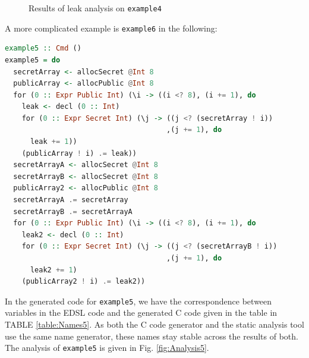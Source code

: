\documentclass[10pt, conference]{IEEEtran}
\newcommand{\ttt}{\texttt}
\begin{document}
\begin{figure}[h]
\centering
\caption{Results of leak analysis on \ttt{example4}}
\label{fig:Analysis4}
\end{figure}

A more complicated example is \ttt{example6} in the following:

\begin{lstlisting}[language=Haskell]
example5 :: Cmd ()
example5 = do
  secretArray <- allocSecret @Int 8
  publicArray <- allocPublic @Int 8
  for (0 :: Expr Public Int) (\i -> ((i <? 8), (i += 1), do
    leak <- decl (0 :: Int)
    for (0 :: Expr Secret Int) (\j -> ((j <? (secretArray ! i))
                                      ,(j += 1), do
      leak += 1))
    (publicArray ! i) .= leak))
  secretArrayA <- allocSecret @Int 8
  secretArrayB <- allocSecret @Int 8
  publicArray2 <- allocPublic @Int 8
  secretArrayA .= secretArray
  secretArrayB .= secretArrayA
  for (0 :: Expr Public Int) (\i -> ((i <? 8), (i += 1), do
    leak2 <- decl (0 :: Int)
    for (0 :: Expr Secret Int) (\j -> ((j <? (secretArrayB ! i))
                                      ,(j += 1), do
      leak2 += 1)
    (publicArray2 ! i) .= leak2))
\end{lstlisting}

In the generated code for \ttt{example5}, we have the correspondence between variables in the EDSL code and the
generated C code given in the table in TABLE \ref{table:Names5}. As both the C code generator and the
static analysis tool use the same name generator, these names stay stable across the results of both. The analysis of \ttt{example5} is given in Fig. \ref{fig:Analysis5}.
\end{document}
